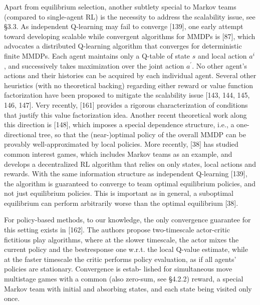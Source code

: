 \documentclass[10pt]{article}
\begin{document}
Apart from equilibrium selection, another subtlety special to Markov teams (compared to single-agent RL) is the necessity to address the scalability issue, see §3.3. As independent Q-learning may fail to converge [139], one early attempt toward developing scalable while convergent algorithms for MMDPs is [87], which advocates a distributed Q-learning algorithm that converges for deterministic finite MMDPs. Each agent maintains only a Q-table of state $s$ and local action $a^{i}$, and successively takes maximization over the joint action $a^{\prime}$. No other agent's actions and their histories can be acquired by each individual agent. Several other heuristics (with no theoretical backing) regarding either reward or value function factorization have been proposed to mitigate the scalability issue [143, 144, 145, 146, 147]. Very recently, [161] provides a rigorous characterization of conditions that justify this value factorization idea. Another recent theoretical work along this direction is [148], which imposes a special dependence structure, i.e., a one-directional tree, so that the (near-)optimal policy of the overall MMDP can be provably well-approximated by local policies. More recently, [38] has studied common interest games, which includes Markov teams as an example, and develops a decentralized RL algorithm that relies on only states, local actions and rewards. With the same information structure as independent Q-learning [139], the algorithm is guaranteed to converge to team optimal equilibrium policies, and not just equilibrium policies. This is important as in general, a suboptimal equilibrium can perform arbitrarily worse than the optimal equilibrium [38].

For policy-based methods, to our knowledge, the only convergence guarantee for this setting exists in [162]. The authors propose two-timescale actor-critic fictitious play algorithms, where at the slower timescale, the actor mixes the current policy and the bestresponse one w.r.t. the local Q-value estimate, while at the faster timescale the critic performs policy evaluation, as if all agents' policies are stationary. Convergence is estab- lished for simultaneous move multistage games with a common (also zero-sum, see §4.2.2) reward, a special Markov team with initial and absorbing states, and each state being visited only once.
\end{document}
